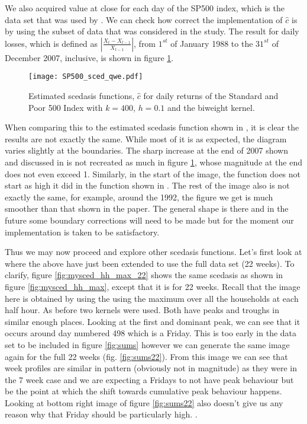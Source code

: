 \documentclass[a4paper]{article}
\begin{document}


We also acquired value at close for each day of the SP500 index, which is the data set that was used by \cite{einmahl16}. We can check how correct the implementation of $\hat{c}$ is by using the subset of data that was considered in the study. The result for daily losses, which is defined as $|\frac{X_t - X_{t-1}}{X_{t-1}}|$, from $1^{st}$ of January 1988 to the $31^{st}$ of December 2007, inclusive, is shown in figure \ref{fig:SP500_sced_daily}.

\begin{figure}
\centering
\texttt{[image: SP500\_sced\_qwe.pdf]}
\caption{\label{fig:SP500_sced_daily} Estimated scedasis functions, $\hat{c}$ for daily returns of the Standard and Poor 500 Index with $k=400$, $h=0.1$ and the biweight kernel.}
\end{figure}

When comparing this to the estimated scedasis function shown in \cite{einmahl16}, it is clear the results are not exactly the same. While most of it is as expected, the diagram varies slightly at the boundaries. The sharp increase at the end of 2007 shown and discussed in \cite{einmahl16} is not recreated as much in figure \ref{fig:SP500_sced_daily}, whose magnitude at the end does not even exceed 1. Similarly, in the start of the image, the function does not start as high it did in the function shown in \cite{einmahl16}. The rest of the image also is not exactly the same, for example, around the 1992, the figure we get is much smoother than that shown in the paper. The general shape is there and in the future some boundary corrections will need to be made but for the moment our implementation is taken to be satisfactory.

Thus we may now proceed and explore other scedasis functions. Let's first look at where the above have just been extended to use the full data set (22 weeks). To clarify, figure \ref{fig:mysced_hh_max_22} shows the same scedasis as shown in figure \ref{fig:mysced_hh_max}, except that it is for 22 weeks. Recall that the image here is obtained by using the using the maximum over all the households at each half hour. As before two kernels were used. Both have peaks and troughs in similar enough places. Looking at the first and dominant peak, we can see that it occurs around day numbered 498 which is a Friday. This is too early in the data set to be included in figure \ref{fig:sums} however we can generate the same image again for the full 22 weeks (fig. \ref{fig:sums22}). From this image we can see that week profiles are similar in pattern (obviously not in magnitude) as they were in the 7 week case and we are expecting a Fridays to not have peak behaviour but be the point at which the shift towards cumulative peak behaviour happens. Looking at bottom right image of figure \ref{fig:sums22} also doesn't give us any reason why that Friday should be particularly high. .
\end{document}
